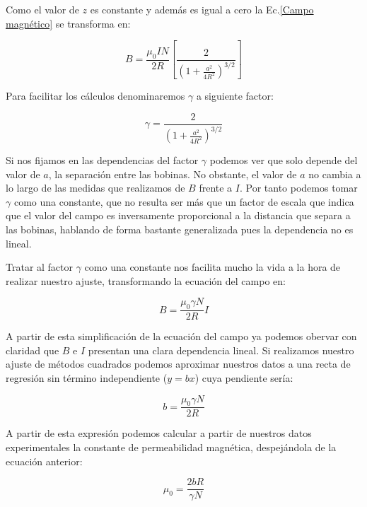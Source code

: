 \documentclass[a4paper,12pt,titlepage]{article}
\begin{document}
\par Como el valor de $z$ es constante y además es igual a cero la Ec.\ref{Campo magnético} se transforma en:

\begin{equation}
    B=\frac{\mu_0 I N}{2 R}\left[\frac{2}{\left(1+\frac{a^2}{4R^2}\right)^{3 / 2}}\right]
\end{equation}

Para facilitar los cálculos denominaremos $\gamma$ a siguiente factor:

\begin{equation}
    \gamma = \frac{2}{\left(1+\frac{a^2}{4R^2}\right)^{3 / 2}}
    \label{Factor gamma}
\end{equation}

Si nos fijamos en las dependencias del factor $\gamma$ podemos ver que solo depende del valor de $a$, la separación entre las bobinas. No obstante, el valor de $a$ no cambia a lo largo de las medidas que realizamos de $B$ frente a $I$. Por tanto podemos tomar $\gamma$ como una constante, que no resulta ser más que un factor de escala que indica que el valor del campo es inversamente proporcional a la distancia que separa a las bobinas, hablando de forma bastante generalizada pues la dependencia no es lineal.

\par Tratar al factor $\gamma$ como una constante nos facilita mucho la vida a la hora de realizar nuestro ajuste, transformando la ecuación del campo en:

\begin{equation}
    B=\frac{\mu_0 \gamma N}{2 R} I
    \label{Ec campo reducida}
\end{equation}

A partir de esta simplificación de la ecuación del campo ya podemos obervar con claridad que $B$ e $I$ presentan una clara dependencia lineal. Si realizamos nuestro ajuste de métodos cuadrados podemos aproximar nuestros datos a una recta de regresión sin término independiente ($y=bx$) cuya pendiente sería:

\begin{equation}
    b = \frac{\mu_0 \gamma N}{2 R}
\end{equation}

A partir de esta expresión podemos calcular a partir de nuestros datos experimentales la constante de permeabilidad magnética, despejándola de la ecuación anterior:

\begin{equation}
    \mu_0 = \frac{2bR}{\gamma N}
    \label{Permeabilidad magnética}
\end{equation}
\end{document}
